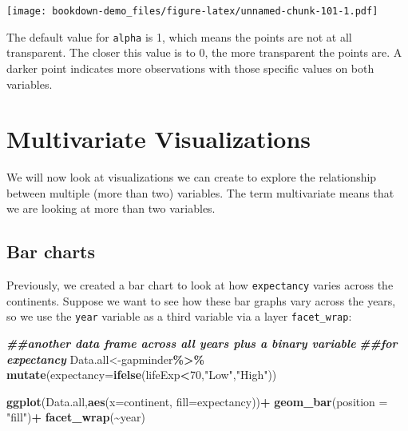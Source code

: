 \documentclass[
]{book}
\newenvironment{Shaded}{\begin{snugshade}}{\end{snugshade}}
\newcommand{\AttributeTok}[1]{\textcolor[rgb]{0.13,0.29,0.53}{#1}}
\newcommand{\DecValTok}[1]{\textcolor[rgb]{0.00,0.00,0.81}{#1}}
\newcommand{\DocumentationTok}[1]{\textcolor[rgb]{0.56,0.35,0.01}{\textbf{\textit{#1}}}}
\newcommand{\FunctionTok}[1]{\textcolor[rgb]{0.13,0.29,0.53}{\textbf{#1}}}
\newcommand{\NormalTok}[1]{#1}
\newcommand{\OtherTok}[1]{\textcolor[rgb]{0.56,0.35,0.01}{#1}}
\newcommand{\SpecialCharTok}[1]{\textcolor[rgb]{0.81,0.36,0.00}{\textbf{#1}}}
\newcommand{\StringTok}[1]{\textcolor[rgb]{0.31,0.60,0.02}{#1}}
\begin{document}
\texttt{[image: bookdown-demo\_files/figure-latex/unnamed-chunk-101-1.pdf]}

The default value for \texttt{alpha} is 1, which means the points are not at all transparent. The closer this value is to 0, the more transparent the points are. A darker point indicates more observations with those specific values on both variables.

\hypertarget{multivariate-visualizations}{%
\section{Multivariate Visualizations}\label{multivariate-visualizations}}

We will now look at visualizations we can create to explore the relationship between multiple (more than two) variables. The term multivariate means that we are looking at more than two variables.

\hypertarget{bar-charts-2}{%
\subsection{Bar charts}\label{bar-charts-2}}

Previously, we created a bar chart to look at how \texttt{expectancy} varies across the continents. Suppose we want to see how these bar graphs vary across the years, so we use the \texttt{year} variable as a third variable via a layer \texttt{facet\_wrap}:

\begin{Shaded}
\begin{Highlighting}[]
\DocumentationTok{\#\#another data frame across all years plus a binary variable }
\DocumentationTok{\#\#for expectancy}
\NormalTok{Data.all}\OtherTok{\textless{}{-}}\NormalTok{gapminder}\SpecialCharTok{\%\textgreater{}\%}
  \FunctionTok{mutate}\NormalTok{(}\AttributeTok{expectancy=}\FunctionTok{ifelse}\NormalTok{(lifeExp}\SpecialCharTok{\textless{}}\DecValTok{70}\NormalTok{,}\StringTok{"Low"}\NormalTok{,}\StringTok{"High"}\NormalTok{))}

\FunctionTok{ggplot}\NormalTok{(Data.all,}\FunctionTok{aes}\NormalTok{(}\AttributeTok{x=}\NormalTok{continent, }\AttributeTok{fill=}\NormalTok{expectancy))}\SpecialCharTok{+}
  \FunctionTok{geom\_bar}\NormalTok{(}\AttributeTok{position =} \StringTok{"fill"}\NormalTok{)}\SpecialCharTok{+}
  \FunctionTok{facet\_wrap}\NormalTok{(}\SpecialCharTok{\textasciitilde{}}\NormalTok{year)}
\end{Highlighting}
\end{Shaded}
\end{document}

